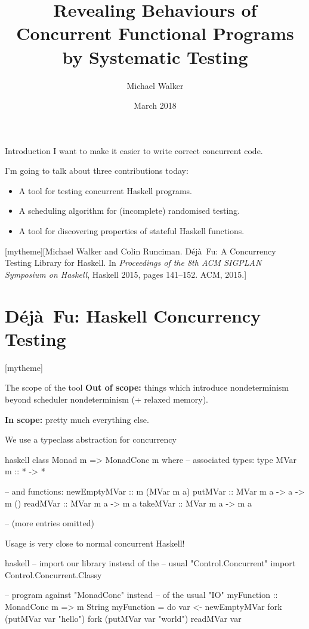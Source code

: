 \documentclass{beamer}
\title{Revealing Behaviours of Concurrent Functional Programs by Systematic Testing}
\date{March 2018}
\author{Michael Walker}
\newcommand{\sectiontext}[2]{%
\setbeamertemplate{section page}[mytheme][#2]%
\section{#1}%
\setbeamertemplate{section page}[mytheme]}
\newcommand{\dejafu}{D\'{e}j\`{a}~Fu}
\begin{document}
\maketitle

\begin{frame}{Introduction}
  I want to make it easier to write correct concurrent code.

  I'm going to talk about three contributions today:

  \begin{itemize}
  \item A tool for testing concurrent Haskell programs.
  \item A scheduling algorithm for (incomplete) randomised testing.
  \item A tool for discovering properties of stateful Haskell
    functions.
  \end{itemize}
\end{frame}

\sectiontext{\dejafu{}: Haskell Concurrency Testing}{Michael Walker and Colin Runciman.  \dejafu{}: A Concurrency Testing Library for Haskell.  In \emph{Proceedings of the 8th ACM SIGPLAN Symposium on Haskell}, Haskell 2015, pages 141--152.  ACM, 2015.}

\begin{frame}{The scope of the tool}
  \textbf{Out of scope:} things which introduce nondeterminism beyond
  scheduler nondeterminism (+ relaxed memory).

  \textbf{In scope:} pretty much everything else.
\end{frame}

\begin{frame}[fragile]{We use a typeclass abstraction for concurrency}
\begin{center}
\begin{cminted}{haskell}
class Monad m => MonadConc m where
  -- associated types:
  type MVar m :: * -> *

  -- and functions:
  newEmptyMVar :: m (MVar m a)
  putMVar  :: MVar m a -> a -> m ()
  readMVar :: MVar m a -> m a
  takeMVar :: MVar m a -> m a

  -- (more entries omitted)
\end{cminted}
\end{center}
\end{frame}

\begin{frame}[fragile]{Usage is very close to normal concurrent Haskell!}
\begin{center}
\begin{cminted}{haskell}
-- import our library instead of the
-- usual "Control.Concurrent"
import Control.Concurrent.Classy

-- program against "MonadConc" instead
-- of the usual "IO"
myFunction :: MonadConc m => m String
myFunction = do
  var <- newEmptyMVar
  fork (putMVar var "hello")
  fork (putMVar var "world")
  readMVar var
\end{cminted}
\end{center}
\end{frame}
\end{document}
